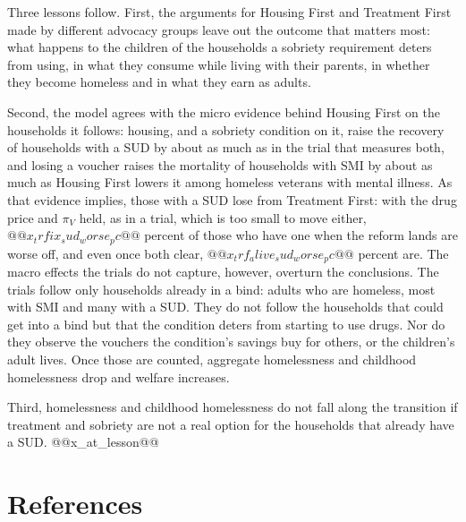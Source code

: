 \documentclass[10pt]{article}
\begin{document}
Three lessons follow. First, the arguments for Housing First and Treatment First made by different advocacy
groups leave out the outcome that matters most: what happens to the children of the households a sobriety requirement deters from using, in what they consume while living with their parents, in whether they become homeless and in what they earn as adults.

Second, the model agrees with the micro evidence behind Housing First on the households it follows: housing, and a sobriety condition on it, raise the recovery of households with a SUD by about as much as in the trial that measures both, and losing a voucher raises the mortality of households with SMI by about as much as Housing First lowers it among homeless veterans with mental illness. As that evidence implies, those with a SUD lose from Treatment First: with the drug price and $\pi_V$ held, as in a trial, which is too small to move either, $@@x_trfix_sud_worse_pc@@$ percent of those who have one when the reform lands are worse off, and even once both clear, $@@x_trf_alive_sud_worse_pc@@$ percent are. The macro effects the trials do not capture, however, overturn the conclusions. The trials follow only households already in a bind: adults who are homeless, most with SMI and many with a SUD. They do not follow the households that could get into a bind but that the condition deters from starting to use drugs. Nor do they observe the vouchers the condition's savings buy for others, or the children's adult lives. Once those are counted, aggregate homelessness and childhood homelessness drop and welfare increases.

Third, homelessness and childhood homelessness do not fall along the transition if treatment and sobriety are not a real option for the households that already have a SUD. @@x_at_lesson@@

\clearpage


\section*{References}
\end{document}

